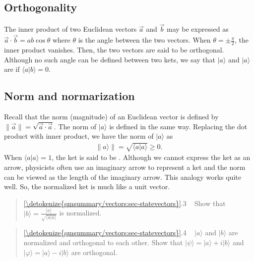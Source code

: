 \documentclass[letterpaper,10pt,english]{jupyterBook}
\begin{document}
\subsection{Orthogonality}
\label{\detokenize{qmsummary/vectors:orthogonality}}
\sphinxAtStartPar
The inner product of two Euclidean vectors \(\vec{a}\) and \(\vec{b}\) may be expressed as \(\vec{a}\cdot\vec{b} = a b \cos\theta\) where \(\theta\) is the angle between the two vectors. When \(\theta = \pm \frac{\pi}{2}\), the inner product vanishes.  Then, the two vectors are said to be orthogonal. Although no such angle can be defined between two kets, we say that \(|a\rangle\) and \(|a\rangle\) are  if \(\langle a | b \rangle = 0\).


\subsection{Norm and normarization}
\label{\detokenize{qmsummary/vectors:norm-and-normarization}}
\sphinxAtStartPar
Recall that the norm (magnitude) of an Euclidean vector is defined by \(\|\vec{a}\| = \sqrt{\vec{a}\cdot\vec{a}}\).
The norm of \(| a \rangle\) is defined in the same way.  Replacing the dot product with inner product, we have the norm of \(|a\rangle\) as
\begin{equation*}
\begin{split}
\|a\rangle\| = \sqrt{\langle a|a \rangle}  \ge 0.
\end{split}
\end{equation*}
\sphinxAtStartPar
When \(\langle a|a \rangle = 1\), the ket is said to be .  Although we cannot express the ket as an arrow, physicists often use an imaginary arrow to represent a ket and the norm can be viewed as the length of the imaginary arrow.  This analogy works quite well.  So, the normalized ket is much like a unit vector.
\begin{quote}

\sphinxAtStartPar
{} \hyperref[\detokenize{qmsummary/vectors:sec-statevectors}]{\ref{\detokenize{qmsummary/vectors:sec-statevectors}}}.3    Show that \(|b\rangle = \frac{|a\rangle}{\sqrt{\langle a|a \rangle}}\) is normalized.
\end{quote}
\begin{quote}

\sphinxAtStartPar
{} \hyperref[\detokenize{qmsummary/vectors:sec-statevectors}]{\ref{\detokenize{qmsummary/vectors:sec-statevectors}}}.4     \(|a\rangle\) and \(|b\rangle\) are normalized and orthogonal to each other. Show that \(|\psi\rangle = |a\rangle + i |b \rangle\) and \(|\varphi\rangle = |a\rangle - i |b \rangle\) are orthogonal.
\end{quote}
\end{document}
